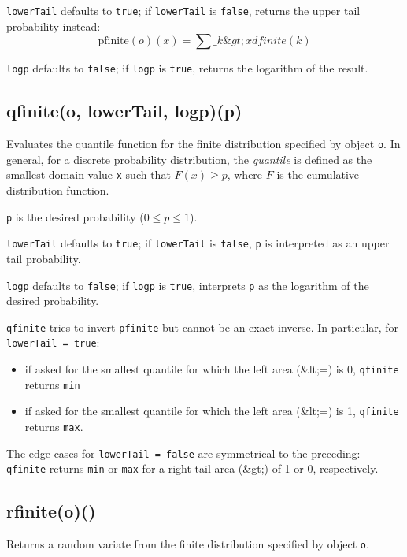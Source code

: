 \documentclass{article}
\begin{document}
\texttt{lowerTail} defaults to \texttt{true}; if \texttt{lowerTail} is \texttt{false}, returns
the upper tail probability instead:
$$\textrm{pfinite}(o)(x) = \sum\_{k \&gt; x} dfinite(k)$$


\texttt{logp} defaults to \texttt{false}; if \texttt{logp} is \texttt{true}, returns the logarithm
of the result.


    \subsection*{qfinite(o, lowerTail, logp)(p)}
    Evaluates the quantile function for the finite distribution
specified by object \texttt{o}.
In general, for a discrete probability
distribution, the \emph{quantile} is defined as the smallest domain value
\texttt{x} such that $F(x) \geq p$, where $F$ is the cumulative
distribution function.


\texttt{p} is the desired probability ($0 \leq p \leq 1$).


\texttt{lowerTail} defaults to \texttt{true}; if \texttt{lowerTail} is \texttt{false}, \texttt{p} is
interpreted as an upper tail probability.


\texttt{logp} defaults to \texttt{false}; if \texttt{logp} is \texttt{true}, interprets \texttt{p} as
the logarithm of the desired probability.


\texttt{qfinite} tries to invert \texttt{pfinite} but cannot be an exact inverse.
In particular, for \texttt{lowerTail = true}:


\begin{itemize}

\item if asked for the smallest quantile for which the left area (\&lt;=) is 0, \texttt{qfinite} returns
\texttt{min}

\item if asked for the smallest quantile for which the left area (\&lt;=) is 1,
\texttt{qfinite} returns \texttt{max}.

\end{itemize}

The edge cases for \texttt{lowerTail = false} are symmetrical to the preceding:
\texttt{qfinite} returns \texttt{min} or \texttt{max} for a right-tail area (\&gt;) of 1 or 0, respectively.


    \subsection*{rfinite(o)()}
    Returns a random variate from the finite distribution
specified by object \texttt{o}.
\end{document}
